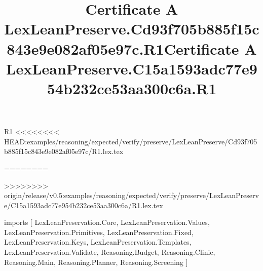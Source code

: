 \begin{lexlean}{R1}
<<<<<<<< HEAD:examples/reasoning/expected/verify/preserve/LexLeanPreserve/Cd93f705b885f15c843e9e082af05e97c/R1.lex.tex
\title{Certificate A LexLeanPreserve.Cd93f705b885f15c843e9e082af05e97c.R1}
========
\title{Certificate A LexLeanPreserve.C15a1593adc77e954b232ce53aa300c6a.R1}
>>>>>>>> origin/release/v0.5:examples/reasoning/expected/verify/preserve/LexLeanPreserve/C15a1593adc77e954b232ce53aa300c6a/R1.lex.tex
\begin{coremodule}
imports [
  LexLeanPreservation.Core,
  LexLeanPreservation.Values,
  LexLeanPreservation.Primitives,
  LexLeanPreservation.Fixed,
  LexLeanPreservation.Keys,
  LexLeanPreservation.Templates,
  LexLeanPreservation.Validate,
  Reasoning.Budget,
  Reasoning.Clinic,
  Reasoning.Main,
  Reasoning.Planner,
  Reasoning.Screening
]


\end{coremodule}
\end{lexlean}
